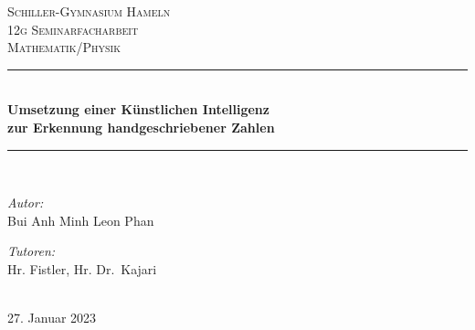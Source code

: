 \documentclass[11pt]{article}
\begin{document}
\begin{titlepage}

    \newcommand{\HRule}{\rule{\linewidth}{0.5mm}}
    \centering
    \textsc{\LARGE Schiller-Gymnasium Hameln}\\[1.5cm]
    \textsc{\Large 12g Seminarfacharbeit}\\[0.5cm]
    \textsc{\Large Mathematik/Physik}\\[0.5cm]
    
    
    \HRule{} \\[0.4cm]
    { \huge \bfseries Umsetzung einer Künstlichen Intelligenz
    \\zur Erkennung handgeschriebener Zahlen}\\[0.4cm]
    \HRule{} \\[1.5cm]
     
    
    \begin{minipage}{0.4\textwidth}
    \begin{flushleft} \large
    \emph{Autor:}\\
    Bui Anh Minh Leon Phan\\
    \end{flushleft}
    \end{minipage}
    \begin{minipage}{0.4\textwidth}
    \begin{flushright} \large
    \emph{Tutoren:} \\
    Hr. Fistler, Hr. Dr.\ Kajari\\
    \end{flushright}
    \end{minipage}\\[2cm]
    
    
    {\large 27. Januar 2023}\\[2cm]
    

\end{titlepage}
\end{document}
